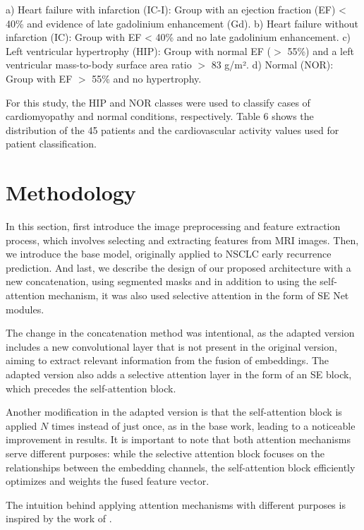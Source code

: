 \documentclass[journal,twoside,web]{ieeecolor}
\begin{document}
a) Heart failure with infarction (IC-I): Group with an ejection fraction (EF) < 40\% and evidence of late gadolinium enhancement (Gd).  
b) Heart failure without infarction (IC): Group with EF < 40\% and no late gadolinium enhancement.  
c) Left ventricular hypertrophy (HIP): Group with normal EF ($>$ 55\%) and a left ventricular mass-to-body surface area ratio $>$ 83 g/m².  
d) Normal (NOR): Group with EF $>$ 55\% and no hypertrophy.  

For this study, the HIP and NOR classes were used to classify cases of cardiomyopathy and normal conditions, respectively. Table 6 shows the distribution of the 45 patients and the cardiovascular activity values used for patient classification.

\section{Methodology}

In this section, first introduce the image preprocessing and feature extraction process, which involves selecting and extracting features from \gls{MRI} images. Then, we introduce the base model, originally applied to \gls{NSCLC} early recurrence prediction. And last, we describe the design of our proposed architecture with a new concatenation, using segmented masks and in addition to using the self-attention mechanism, it was also used selective attention in the form of \gls{SE} Net modules.

The change in the concatenation method was intentional, as the adapted version includes a new convolutional layer that is not present in the original version, aiming to extract relevant information from the fusion of embeddings. The adapted version also adds a selective attention layer in the form of an \gls{SE} block, which precedes the self-attention block.  

Another modification in the adapted version is that the self-attention block is applied $N$ times instead of just once, as in the base work, leading to a noticeable improvement in results. It is important to note that both attention mechanisms serve different purposes: while the selective attention block focuses on the relationships between the embedding channels, the self-attention block efficiently optimizes and weights the fused feature vector.  

The intuition behind applying attention mechanisms with different purposes is inspired by the work of \cite{yangNeuralNetworkDesign2024a}.
\end{document}
